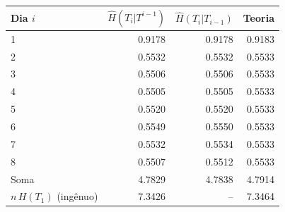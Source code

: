 \begin{tabular}{lrrr}
\toprule
Dia $i$ & $\hat H(T_i|T^{i-1})$ & $\hat H(T_i|T_{i-1})$ & Teoria \\
\midrule
1 & 0.9178 & 0.9178 & 0.9183 \\
2 & 0.5532 & 0.5532 & 0.5533 \\
3 & 0.5506 & 0.5506 & 0.5533 \\
4 & 0.5505 & 0.5505 & 0.5533 \\
5 & 0.5520 & 0.5520 & 0.5533 \\
6 & 0.5549 & 0.5550 & 0.5533 \\
7 & 0.5532 & 0.5534 & 0.5533 \\
8 & 0.5507 & 0.5512 & 0.5533 \\
Soma & 4.7829 & 4.7838 & 4.7914 \\
$n\,H(T_1)$ (ingênuo) & 7.3426 & -- & 7.3464 \\
\bottomrule
\end{tabular}
